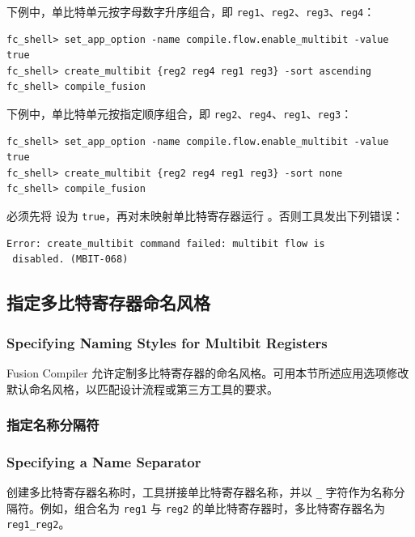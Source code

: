 下例中，单比特单元按字母数字升序组合，即 \texttt{reg1}、\texttt{reg2}、\texttt{reg3}、\texttt{reg4}：
\begin{lstlisting}
fc_shell> set_app_option -name compile.flow.enable_multibit -value true
fc_shell> create_multibit {reg2 reg4 reg1 reg3} -sort ascending
fc_shell> compile_fusion
\end{lstlisting}

下例中，单比特单元按指定顺序组合，即 \texttt{reg2}、\texttt{reg4}、\texttt{reg1}、\texttt{reg3}：
\begin{lstlisting}
fc_shell> set_app_option -name compile.flow.enable_multibit -value true
fc_shell> create_multibit {reg2 reg4 reg1 reg3} -sort none
fc_shell> compile_fusion
\end{lstlisting}

\begin{noteBox}
必须先将  设为 \texttt{true}，再对未映射单比特寄存器运行 。否则工具发出下列错误：
\begin{lstlisting}
Error: create_multibit command failed: multibit flow is
 disabled. (MBIT-068)
\end{lstlisting}
\end{noteBox}

\subsection{指定多比特寄存器命名风格}
\subsubsection*{Specifying Naming Styles for Multibit Registers}

Fusion Compiler 允许定制多比特寄存器的命名风格。可用本节所述应用选项修改默认命名风格，以匹配设计流程或第三方工具的要求。

\subsubsection{指定名称分隔符}
\subsubsection*{Specifying a Name Separator}

创建多比特寄存器名称时，工具拼接单比特寄存器名称，并以 \texttt{\_} 字符作为名称分隔符。例如，组合名为 \texttt{reg1} 与 \texttt{reg2} 的单比特寄存器时，多比特寄存器名为 \texttt{reg1\_reg2}。

